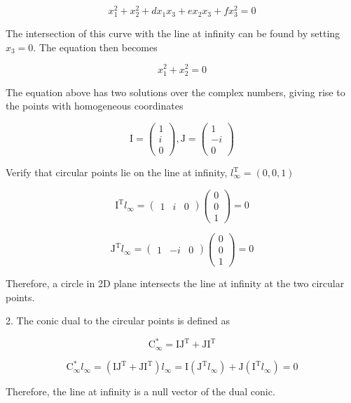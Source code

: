 \documentclass[conference]{IEEEtran}
\begin{document}
\[ x_1^2 + x_2^2 + dx_1x_3 + ex_2x_3 + fx_3^2 = 0 \]

The intersection of this curve with the line at infinity can be found by setting \( x_3 = 0\). The equation then becomes 

\[ x_1^2 + x_2^2 = 0 \]

The equation above has two solutions over the complex numbers, giving rise to the points with homogeneous
coordinates

\[ \mathrm{I} = \begin{pmatrix} 1\\i\\0 \end{pmatrix}, 
\mathrm{J} = \begin{pmatrix} 1\\-i\\0 \end{pmatrix} \]

Verify that circular points lie on the line at infinity, \( l_{\infty}^\mathrm{T} = (0, 0, 1)\) 

\[ \mathrm{I}^\mathrm{T}l_{\infty} = 
\begin{pmatrix}
1 & i & 0
\end{pmatrix}\begin{pmatrix} 0\\0\\1 \end{pmatrix} = 0 \]

\[ \mathrm{J}^\mathrm{T}l_{\infty} = 
\begin{pmatrix}
1 & -i & 0
\end{pmatrix}\begin{pmatrix} 0\\0\\1 \end{pmatrix} = 0 \]

Therefore, a circle in 2D plane intersects the line at infinity at the two circular points.

2. The conic dual to the circular points is defined as

\[ \mathrm{C}^{*}_{\infty} = \mathrm{I}\mathrm{J}^\mathrm{T} + \mathrm{J}\mathrm{I}^\mathrm{T}\]

\[ \mathrm{C}^{*}_{\infty} l_{\infty} = 
(\mathrm{I}\mathrm{J}^\mathrm{T} + \mathrm{J}\mathrm{I}^\mathrm{T})l_{\infty}=
\mathrm{I}(\mathrm{J}^\mathrm{T}l_{\infty}) + \mathrm{J}(\mathrm{I}^\mathrm{T}l_{\infty}) = 0\]

Therefore, the line at infinity is a null vector of the dual conic. 
\end{document}
